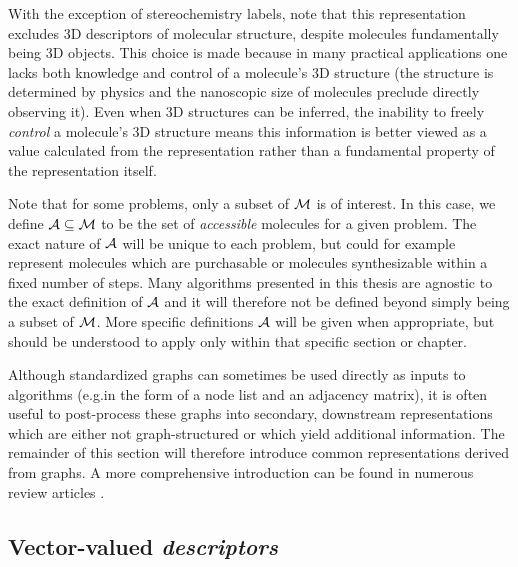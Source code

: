 With the exception of stereochemistry labels,
note that this representation excludes 3D descriptors of molecular structure,
despite molecules fundamentally being 3D objects.
This choice is made because in many practical applications one lacks both knowledge and control of a molecule's 3D structure
(the structure is determined by physics and the nanoscopic size of molecules preclude directly observing it).
Even when 3D structures can be inferred, the inability to freely \emph{control}
a molecule's 3D structure means this information is better viewed as a value calculated from the representation
rather than a fundamental property of the representation itself.

Note that for some problems,
only a subset of $\mathcal{M}$ is of interest.
In this case, we define $\mathcal{A}\subseteq\mathcal{M}$ to be the set of \emph{accessible}
molecules for a given problem.
The exact nature of $\mathcal{A}$ will be unique to each problem,
but could for example represent molecules which are purchasable
or molecules synthesizable within a fixed number of steps.
Many algorithms presented in this thesis are agnostic to the exact definition
of $\mathcal{A}$ and it will therefore not be defined beyond simply being a subset of $\mathcal{M}$.
More specific definitions $\mathcal{A}$ will be given when appropriate,
but should be understood to apply only within that specific section or chapter.

Although standardized graphs can sometimes be used directly as inputs to algorithms
(e.g.\@ in the form of a node list and an adjacency matrix),
it is often useful to post-process
these graphs into secondary, downstream representations
which are either not graph-structured or which yield additional information.
The remainder of this section will therefore introduce
common representations derived from graphs.
A more comprehensive introduction can be found in numerous review articles
\citep{david2020molecular,wigh2022representation,mcgibbon2023smol-representation}.

\subsection{Vector-valued \emph{descriptors}}

